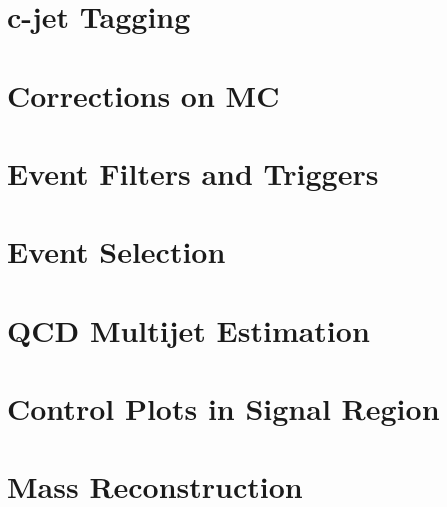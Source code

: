 \documentclass[11pt,twoside,a4paper,an]{cms-tdr}
\begin{document}
\section{c-jet Tagging}
\label{s:cTag}


\newpage
\section{Corrections on MC}
\label{s:secMCSF}


\newpage
\section{Event Filters and Triggers}
\label{s:secFilters}


\section{Event Selection}
\label{s:secEvtSel}


\newpage
\section{QCD Multijet Estimation}
\label{s:secQCD}


\newpage
\section{Control Plots in Signal Region}
\label{s:secCPlots}


\newpage
\section{Mass Reconstruction}
\label{s:secMassReco}

\end{document}
